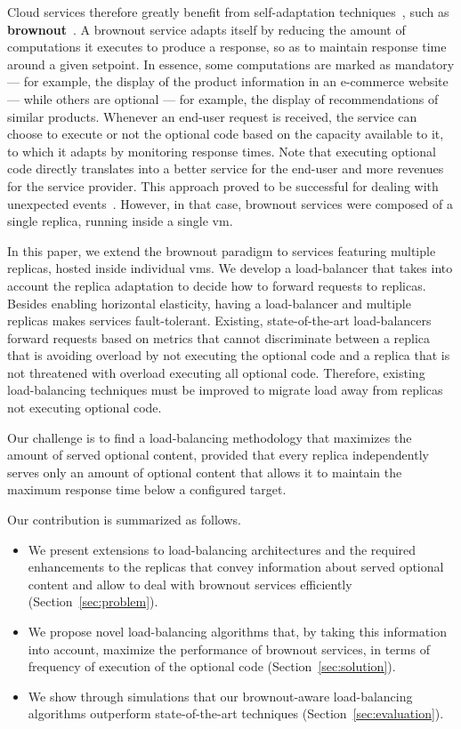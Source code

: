 Cloud services therefore greatly benefit from self-adaptation
techniques~\cite{SalehieSelfadaptive:TAAS}, such as {\bf
  brownout}~\citep{cloudish-tr}. A brownout service adapts itself by
reducing the amount of computations it executes to produce a response,
so as to maintain response time around a given setpoint.  In essence,
some computations are marked as mandatory --- for example, the display
of the product information in an e-commerce website --- while others
are optional --- for example, the display of recommendations of
similar products.  Whenever an end-user request is received, the
service can choose to execute or not the optional code based on the
capacity available to it, to which it adapts by monitoring response
times. Note that executing optional code directly translates into a
better service for the end-user and more revenues for the service
provider. This approach proved to be successful for dealing with
unexpected events~\citep{cloudish-tr}. However, in that case, brownout
services were composed of a single replica, running inside a single
\ac{vm}.

In this paper, we extend the brownout paradigm to services featuring
multiple replicas, hosted inside individual \acp{vm}. We develop a
load-balancer that takes into account the replica adaptation to decide
how to forward requests to replicas.  Besides enabling horizontal
elasticity, having a load-balancer and multiple replicas makes
services fault-tolerant. Existing, state-of-the-art load-balancers
forward requests based on metrics that cannot discriminate between a
replica that is avoiding overload by not executing the optional code
and a replica that is not threatened with overload executing all
optional code. Therefore, existing load-balancing techniques must be
improved to migrate load away from replicas not executing optional
code.

Our challenge is to find a load-balancing methodology that maximizes
the amount of served optional content, provided that every replica
independently serves only an amount of optional content that allows it
to maintain the maximum response time below a configured target.

Our contribution is summarized as follows.
\begin{itemize}
\item We present extensions to load-balancing architectures and the
  required enhancements to the replicas that convey information about
  served optional content and allow to deal with brownout services
  efficiently (Section~\ref{sec:problem}).
\item We propose novel load-balancing algorithms that, by taking this
  information into account, maximize the performance of brownout
  services, in terms of frequency of execution of the optional code
  (Section~\ref{sec:solution}).
\item We show through simulations that our brownout-aware
  load-balancing algorithms outperform state-of-the-art techniques
  (Section~\ref{sec:evaluation}).
\end{itemize}

